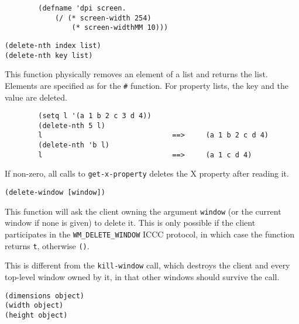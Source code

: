 {\exemplefont\begin{verbatim}
        (defname 'dpi screen.
            (/ (* screen-width 254) 
                (* screen-widthMM 10)))
\end{verbatim}}


{\usagefont\begin{verbatim}
(delete-nth index list)
(delete-nth key list)
\end{verbatim}}\usageupspace

This function physically removes an element of a list and returns the list. 
Elements are specified as for the \verb"#" function. 
For property lists, the key and the value are deleted.

{\exemplefont\begin{verbatim}
        (setq l '(a 1 b 2 c 3 d 4))
        (delete-nth 5 l)
        l                               ==>     (a 1 b 2 c d 4)
        (delete-nth 'b l)
        l                               ==>     (a 1 c d 4)
\end{verbatim}}



If non-zero, all calls to \verb|get-x-property| deletes the X property after
reading it.


{\usagefont\begin{verbatim}
(delete-window [window])
\end{verbatim}}\usageupspace

This function will ask the client owning the argument \verb"window" (or the
current window if none is given) to delete it. This is only possible if the
client participates in the \verb"WM_DELETE_WINDOW" ICCC protocol, in which
case the function returns \verb"t", otherwise \verb"()".

This is different from the \verb"kill-window" call, which destroys the
client and every top-level window owned by it, in that other windows should
survive the call.


{\usagefont\begin{verbatim}
(dimensions object)
(width object)
(height object)
\end{verbatim}}\usageupspace

